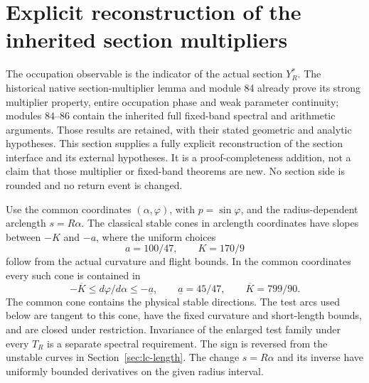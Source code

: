 \section{Explicit reconstruction of the inherited section multipliers}
\label{sec:sm-section}

The occupation observable is the indicator of the actual section
$Y_R^*$. The historical native section-multiplier lemma and module
84 already prove its strong multiplier property, entire occupation
phase and weak parameter continuity; modules 84--86 contain the
inherited full fixed-band spectral and arithmetic arguments.
Those results are retained, with their stated geometric and analytic
hypotheses. This section supplies a fully explicit reconstruction
of the section interface and its external hypotheses. It is a
proof-completeness addition, not a claim that those multiplier or
fixed-band theorems are new. No section side is rounded and no
return event is changed.

Use the common coordinates $(\alpha,\varphi)$, with
$p=\sin\varphi$, and the radius-dependent arclength
$s=R\alpha$. The classical stable cones in arclength coordinates
have slopes between $-K$ and $-a$, where the uniform choices
\begin{equation}\label{eq:sm-cone-constants}
 a=100/47,\qquad K=170/9
\end{equation}
follow from the actual curvature and flight bounds. In the common
coordinates every such cone is contained in
\begin{equation}\label{eq:sm-common-cone}
 -\overline K\le d\varphi/d\alpha\le-\underline a,
 \qquad \underline a=45/47,\qquad \overline K=799/90.
\end{equation}
The common cone contains the physical stable directions. The test
arcs used below are tangent to this cone, have the fixed curvature
and short-length bounds, and are closed under restriction. Invariance
of the enlarged test family under every $T_R$ is a separate spectral
requirement. The sign is reversed from the unstable curves in
Section~\ref{sec:lc-length}. The change $s=R\alpha$ and its inverse
have uniformly bounded derivatives on the given radius interval.

